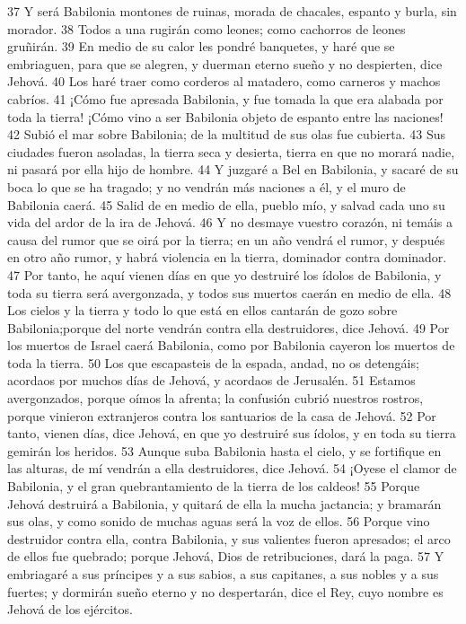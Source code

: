 37 Y será Babilonia montones de ruinas, morada de chacales, espanto y burla, sin morador.
38 Todos a una rugirán como leones; como cachorros de leones gruñirán.
39 En medio de su calor les pondré banquetes, y haré que se embriaguen, para que se alegren, y duerman eterno sueño y no despierten, dice Jehová.
40 Los haré traer como corderos al matadero, como carneros y machos cabríos.
41 ¡Cómo fue apresada Babilonia, y fue tomada la que era alabada por toda la tierra! ¡Cómo vino a ser Babilonia objeto de espanto entre las naciones!
42 Subió el mar sobre Babilonia; de la multitud de sus olas fue cubierta.
43 Sus ciudades fueron asoladas, la tierra seca y desierta, tierra en que no morará nadie, ni pasará por ella hijo de hombre.
44 Y juzgaré a Bel en Babilonia, y sacaré de su boca lo que se ha tragado; y no vendrán más naciones a él, y el muro de Babilonia caerá.
45 Salid de en medio de ella, pueblo mío, y salvad cada uno su vida del ardor de la ira de Jehová.
46 Y no desmaye vuestro corazón, ni temáis a causa del rumor que se oirá por la tierra; en un año vendrá el rumor, y después en otro año rumor, y habrá violencia en la tierra, dominador contra dominador.
47 Por tanto, he aquí vienen días en que yo destruiré los ídolos de Babilonia, y toda su tierra será avergonzada, y todos sus muertos caerán en medio de ella.
48 Los cielos y la tierra y todo lo que está en ellos cantarán de gozo sobre Babilonia;porque del norte vendrán contra ella destruidores, dice Jehová.
49 Por los muertos de Israel caerá Babilonia, como por Babilonia cayeron los muertos de toda la tierra.
50 Los que escapasteis de la espada, andad, no os detengáis; acordaos por muchos días de Jehová, y acordaos de Jerusalén.
51 Estamos avergonzados, porque oímos la afrenta; la confusión cubrió nuestros rostros, porque vinieron extranjeros contra los santuarios de la casa de Jehová.
52 Por tanto, vienen días, dice Jehová, en que yo destruiré sus ídolos, y en toda su tierra gemirán los heridos.
53 Aunque suba Babilonia hasta el cielo, y se fortifique en las alturas, de mí vendrán a ella destruidores, dice Jehová.
54 ¡Oyese el clamor de Babilonia, y el gran quebrantamiento de la tierra de los caldeos!
55 Porque Jehová destruirá a Babilonia, y quitará de ella la mucha jactancia; y bramarán sus olas, y como sonido de muchas aguas será la voz de ellos.
56 Porque vino destruidor contra ella, contra Babilonia, y sus valientes fueron apresados; el arco de ellos fue quebrado; porque Jehová, Dios de retribuciones, dará la paga.
57 Y embriagaré a sus príncipes y a sus sabios, a sus capitanes, a sus nobles y a sus fuertes; y dormirán sueño eterno y no despertarán, dice el Rey, cuyo nombre es Jehová de los ejércitos.
